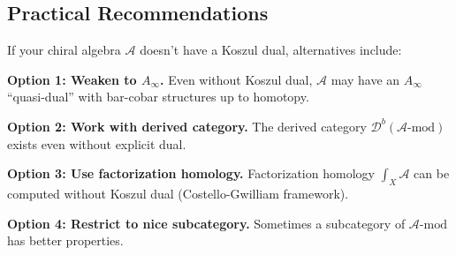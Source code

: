 \subsection{Practical Recommendations}

\begin{remark}\label{rem:no-dual-alternatives}
If your chiral algebra $\mathcal{A}$ doesn't have a Koszul dual, alternatives include:

\textbf{Option 1: Weaken to $A_\infty$.}
Even without Koszul dual, $\mathcal{A}$ may have an $A_\infty$ ``quasi-dual'' with 
bar-cobar structures up to homotopy.

\textbf{Option 2: Work with derived category.}
The derived category $\mathcal{D}^b(\mathcal{A}\text{-mod})$ exists even without 
explicit dual.

\textbf{Option 3: Use factorization homology.}
Factorization homology $\int_X \mathcal{A}$ can be computed without Koszul dual 
(Costello-Gwilliam framework).

\textbf{Option 4: Restrict to nice subcategory.}
Sometimes a subcategory of $\mathcal{A}\text{-mod}$ has better properties.
\end{remark}

